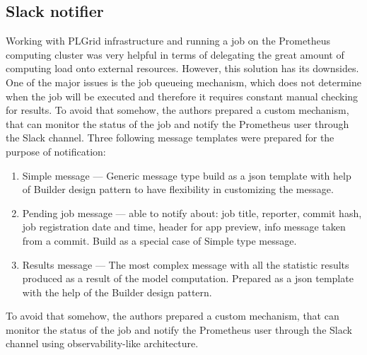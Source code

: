 \subsection{Slack notifier}\label{subsec:slack-notifier}
Working with PLGrid infrastructure and running a job on the Prometheus computing cluster was very helpful in terms of delegating the great amount of computing load onto external resources.
However, this solution has its downsides.
One of the major issues is the job queueing mechanism, which does not determine when the job will be executed and therefore it requires constant manual checking for results.
To avoid that somehow, the authors prepared a custom mechanism, that can monitor the status of the job and notify the Prometheus user through the Slack channel.
Three following message templates were prepared for the purpose of notification:
\begin{enumerate}
    \item Simple message --- Generic message type build as a \gls{json} template with help of Builder design pattern to have flexibility in customizing the message.
    \item Pending job message --- able to notify about: job title, reporter, commit hash, job registration date and time, header for app preview, info message taken from a commit.
    Build as a special case of Simple type message.
    \item Results message --- The most complex message with all the statistic results produced as a result of the model computation.
    Prepared as a \gls{json} template with the help of the Builder design pattern.
\end{enumerate}

To avoid that somehow, the authors prepared a custom mechanism, that can monitor the status of the job and notify the Prometheus user through the Slack channel using observability-like architecture.
